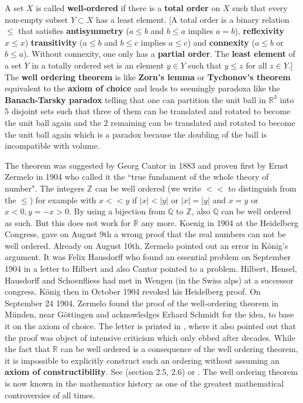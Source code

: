 \documentclass[12pt]{amsart}
\def\satz#1{ \vspace{2mm} \begin{center} \fcolorbox{yellow1}{yellow1}{ \parbox{14.0cm}{{\bf Theorem:} #1}} \vspace{2mm} \end{center} }
\newcounter{example}    \def\example#1{ \item \fontsize{12}{15} \selectfont #1 \fontsize{12}{15} \selectfont }
\begin{document}
A set $X$ is called {\bf well-ordered} if there is a {\bf total order} on $X$ such that
every non-empty subset $Y \subset X$ has a least element. [A total order is a binary relation $\leq$
that satisfies {\bf antisymmetry} ($a \leq b$ and $b \leq a$ implies $a=b$), {\bf reflexivity} $x \leq x$) 
{\bf transitivity} ($a \leq b$ and $b \leq c$ implies $a \leq c$) and {\bf connexity} ($a \leq b$ or $b \leq a$).
Without connexity, one only has a {\bf partial order}.
The {\bf least element} of a set $Y$ in a totally ordered set is an element $y \in Y$ such that $y \leq z$
for all $z \in Y$.] The {\bf well ordering theorem} is like {\bf Zorn's lemma} or {\bf Tychonov's theorem}
equivalent to the {\bf axiom of choice} and leads to seemingly paradoxa like the
{\bf Banach-Tarsky paradox} telling that one can partition the unit ball in $\mathbb{R}^3$ into 5 disjoint
sets such that three of them can be translated and rotated to become the unit ball again and the 2 remaining
can be translated and rotated to become the unit ball again which is a paradox because the doubling of the ball
is incompatible with volume.

\satz{Every set can be well ordered.}

The theorem was suggested by Georg Cantor in 1883 \cite{CantorUnendlichePunktmannigfaltigkeiten} 
and proven first by Ernst Zermelo in 1904 who 
called it the ``true fundament of the whole theory of number". The integers $\mathbb{Z}$ can be well 
ordered (we write $<<$ to distinguish from the $\leq$) for example with 
$x << y$ if $|x|<|y|$ or $|x|=|y|$ and $x=y$ or $x<0,y=-x>0$.
By using a bijection from $\mathbb{Q}$ to $\mathbb{Z}$, also $\mathbb{Q}$ can be well ordered as such. 
But this does not work for $\mathbb{R}$ any more. 
Koenig in 1904 at the Heidelberg Congress, gave on August 9th a wrong proof that the real numbers can 
not be well ordered. Already on August 10th, Zermelo pointed out an error in K\"onig's argument.
It was Felix Hausdorff who found an essential problem on September 1904 in a letter to Hilbert 
and also Cantor pointed to a problem. Hilbert, Hensel, Hausdorff and Schoenfliess had met in
Wengen (in the Swiss alps) at a successor congress. K\"onig then in October 1904 revoked his Heidelberg proof.            
On September 24 1904, Zermelo found the proof of the well-ordering theorem in M\"unden, near G\"ottingen and
acknowledges Erhard Schmidt for the idea, to base it on the axiom of choice. The letter
is printed in \cite{EbbinghausPeckhaus}, where it also pointed out that the proof 
was object of intensive criticism which only ebbed after decades.
While the fact that $\mathbb{R}$ can be well ordered is a consequence of the well ordering theorem,
it is impossible to explicitly construct such an ordering without assuming an 
{\bf axiom of constructibility}. See \cite{EbbinghausPeckhaus}  (section 2.5, 2.6) or 
\cite{Ebbinghaus2007}. The well ordering theorem is now known in the  mathematics history as one of the greatest mathematical controversies of all times. 
\end{document}
